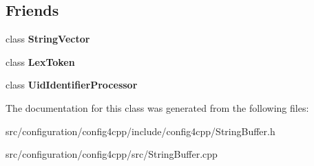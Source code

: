 \subsection*{Friends}
\begin{DoxyCompactItemize}
\item 
\hypertarget{classCONFIG4CPP__NAMESPACE_1_1StringBuffer_a5fbe50040524b198b83c58a5ecd2ef50}{class {\bfseries String\-Vector}}\label{classCONFIG4CPP__NAMESPACE_1_1StringBuffer_a5fbe50040524b198b83c58a5ecd2ef50}

\item 
\hypertarget{classCONFIG4CPP__NAMESPACE_1_1StringBuffer_a15339ed7b0ac5b78024e86961f69edf9}{class {\bfseries Lex\-Token}}\label{classCONFIG4CPP__NAMESPACE_1_1StringBuffer_a15339ed7b0ac5b78024e86961f69edf9}

\item 
\hypertarget{classCONFIG4CPP__NAMESPACE_1_1StringBuffer_a63128c6b1a629610065c7d85dd26ca9e}{class {\bfseries Uid\-Identifier\-Processor}}\label{classCONFIG4CPP__NAMESPACE_1_1StringBuffer_a63128c6b1a629610065c7d85dd26ca9e}

\end{DoxyCompactItemize}


The documentation for this class was generated from the following files\-:\begin{DoxyCompactItemize}
\item 
src/configuration/config4cpp/include/config4cpp/String\-Buffer.\-h\item 
src/configuration/config4cpp/src/String\-Buffer.\-cpp\end{DoxyCompactItemize}
